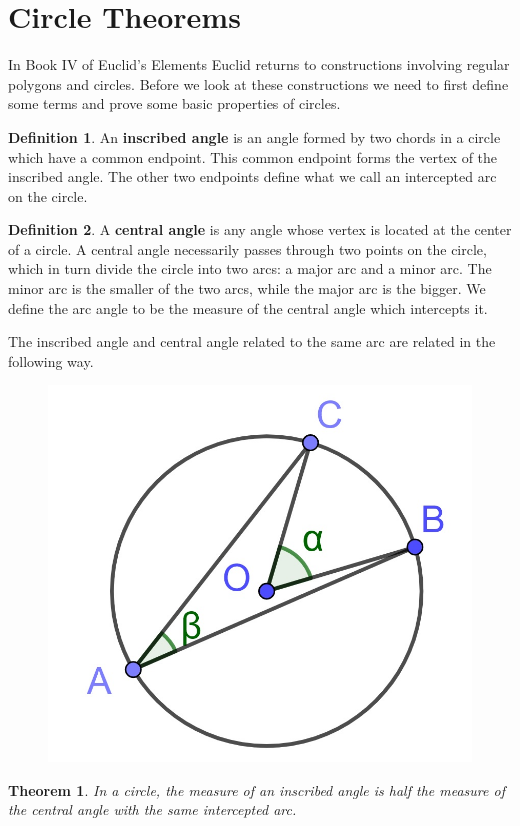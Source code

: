 \documentclass[
]{book}
\let\stdsection\section
\renewcommand\section{\newpage\stdsection}
\newtheorem{theorem}{Theorem}[chapter]
\theoremstyle{definition}
\newtheorem{definition}{Definition}[chapter]
\theoremstyle{definition}
\theoremstyle{definition}
\theoremstyle{definition}
\theoremstyle{remark}
\begin{document}
\hypertarget{circle-theorems}{%
\section{Circle Theorems}\label{circle-theorems}}

In Book IV of Euclid's Elements \citep{Heath1908_2} Euclid returns to constructions involving regular polygons and circles. Before we look at these constructions we need to first define some terms and prove some basic properties of circles.

\begin{definition}
An \textbf{inscribed angle} is an angle formed by two chords in a circle which have a common endpoint. This common endpoint forms the vertex of the inscribed angle. The other two endpoints define what we call an intercepted arc on the circle.
\end{definition}

\begin{definition}
A \textbf{central angle} is any angle whose vertex is located at the center of a circle. A central angle necessarily passes through two points on the circle, which in turn divide the circle into two arcs: a major arc and a minor arc. The minor arc is the smaller of the two arcs, while the major arc is the bigger. We define the arc angle to be the measure of the central angle which intercepts it.
\end{definition}

The inscribed angle and central angle related to the same arc are related in the following way.

\begin{figure}

{\centering \includegraphics[width=0.3\linewidth]{images/ArcAngles} 

}

\end{figure}

\begin{theorem}
In a circle, the measure of an inscribed angle is half the measure of the central angle with the same intercepted arc.
\end{theorem}
\end{document}
